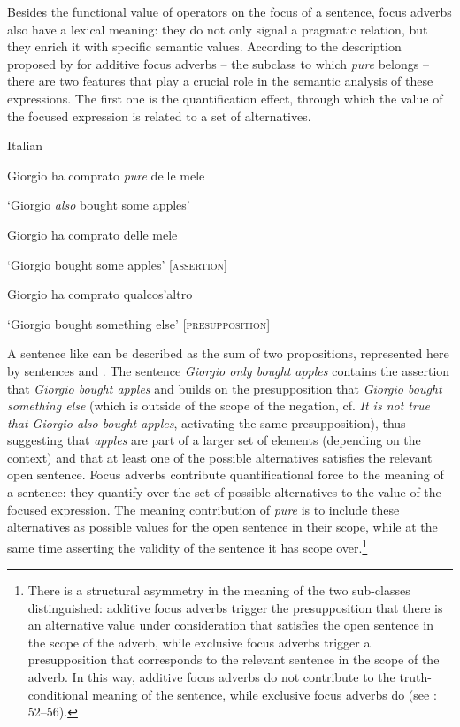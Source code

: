 Besides the functional value of operators on the focus of a sentence, focus adverbs also have a lexical meaning: they do not only signal a pragmatic relation, but they enrich it with specific semantic values. According to the description proposed by \citet[94--119]{König1991} for additive focus adverbs – the subclass to which \textit{pure} belongs – there are two features that play a crucial role in the semantic analysis of these expressions. The first one is the quantification effect, through which the value of the focused expression is related to a set of alternatives.
\newpage

\ea%
    \label{ex:key:13}

          Italian

\ea\label{ex:key:13a}  Giorgio ha comprato \textit{pure} delle mele

\glt ‘Giorgio \textit{also} bought some apples’

\ex\label{ex:key:13b}  Giorgio ha comprato delle mele

\glt ‘Giorgio bought some apples’       [\textsc{assertion}]

\ex\label{ex:key:13c} Giorgio ha comprato qualcos’altro

\glt ‘Giorgio bought something else’     [\textsc{presupposition}]
\z
\z

A sentence like  can be described as the sum of two propositions, represented here by sentences  and . The sentence \textit{Giorgio only bought apples} contains the assertion that \textit{Giorgio bought apples} and builds on the presupposition that \textit{Giorgio bought something else} (which is outside of the scope of the negation, cf. \textit{It is not true that Giorgio also bought apples}, activating the same presupposition), thus suggesting that \textit{apples} are part of a larger set of elements (depending on the context) and that at least one of the possible alternatives satisfies the relevant open sentence. Focus adverbs contribute quantificational force to the meaning of a sentence: they quantify over the set of possible alternatives to the value of the focused expression. The meaning contribution of \textit{pure} is to include these alternatives as possible values for the open sentence in their scope, while at the same time asserting the validity of the sentence it has scope over.\footnote{There is a structural asymmetry in the meaning of the two sub-classes distinguished: additive focus adverbs trigger the presupposition that there is an alternative value under consideration that satisfies the open sentence in the scope of the adverb, while exclusive focus adverbs trigger a presupposition that corresponds to the relevant sentence in the scope of the adverb. In this way, additive focus adverbs do not contribute to the truth-conditional meaning of the sentence, while exclusive focus adverbs do (see \citealt{König1991}: 52–56).}

